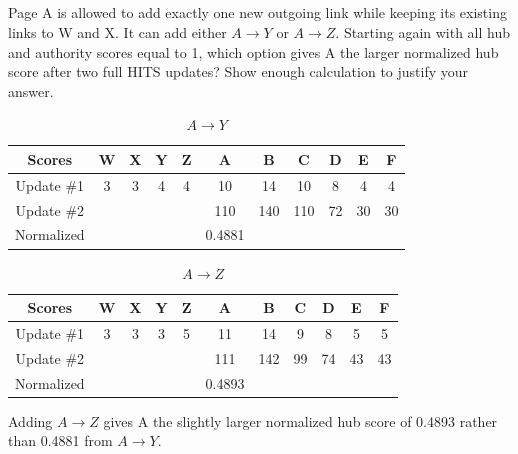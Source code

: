 \documentclass[newpages]{assignment}
\begin{document}
\subsection{}
\begin{problem}
    Page A is allowed to add exactly one new outgoing link while keeping its existing links to W and X. It can add either \(A\to Y\) or \(A\to Z\). Starting again with all hub and authority scores equal to 1, which option gives A the larger normalized hub score after two full HITS updates? Show enough calculation to justify your answer.
\end{problem}

\begin{solution}

    \begin{table}[h]
        \caption{\(A\to Y\)}
        \centering
        \begin{tabular}{ccccccccccc}
            \toprule
            Scores     & W & X & Y & Z & A      & B   & C   & D  & E  & F  \\
            \midrule
            Update \#1 & 3 & 3 & 4 & 4 & 10     & 14  & 10  & 8  & 4  & 4  \\
            Update \#2 &   &   &   &   & 110    & 140 & 110 & 72 & 30 & 30 \\
            \midrule
            Normalized &   &   &   &   & 0.4881 &     &     &    &    &    \\
            \bottomrule
        \end{tabular}
    \end{table}

    \begin{table}[h]
        \caption{\(A\to Z\)}
        \centering
        \begin{tabular}{ccccccccccc}
            \toprule
            Scores     & W & X & Y & Z & A      & B   & C  & D  & E  & F  \\
            \midrule
            Update \#1 & 3 & 3 & 3 & 5 & 11     & 14  & 9  & 8  & 5  & 5  \\
            Update \#2 &   &   &   &   & 111    & 142 & 99 & 74 & 43 & 43 \\
            \midrule
            Normalized &   &   &   &   & 0.4893 &     &    &    &    &    \\
            \bottomrule
        \end{tabular}
    \end{table}

    Adding \(A\to Z\) gives A the slightly larger normalized hub score of 0.4893 rather than 0.4881 from $A \to Y$.
\end{solution}
\end{document}
